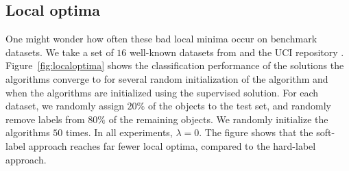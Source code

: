 \documentclass[conference,a4paper,10pt]{IEEEtran}\usepackage[]{graphicx}\usepackage[]{color}
\begin{document}
\subsection{Local optima}
One might wonder how often these bad local minima occur on benchmark datasets. We take a set of $16$ well-known datasets from \cite{Chapelle2006} and the UCI repository \cite{Lichman2013}. Figure~\ref{fig:localoptima} shows the classification performance of the solutions the algorithms converge to for several random initialization of the algorithm and when the algorithms are initialized using the supervised solution. For each dataset, we randomly assign $20\%$ of the objects to the test set, and randomly remove labels from $80\%$ of the remaining objects. We randomly initialize the algorithms $50$ times. In all experiments, $\lambda=0$. The figure shows that the soft-label approach reaches far fewer local optima, compared to the hard-label approach.
\end{document}
